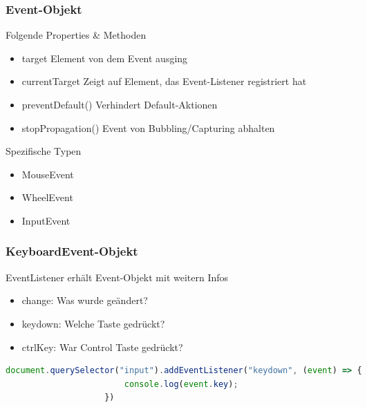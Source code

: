 \documentclass[a4paper, landscape, 8pt]{scrartcl}
\begin{document}
\begin{multicols*}{4}
        \subsubsection{Event-Objekt}
        Folgende Properties \& Methoden
        \begin{itemize}
            \item target
            \subitem Element von dem Event ausging
            \item currentTarget
            \subitem Zeigt auf Element, das Event-Listener registriert hat
            \item preventDefault()
            \subitem Verhindert Default-Aktionen
            \item stopPropagation()
            \subitem Event von Bubbling/Capturing abhalten
        \end{itemize}
        Spezifische Typen
        \begin{itemize}
            \item MouseEvent
            \item WheelEvent
            \item InputEvent
        \end{itemize}

        \subsubsection{KeyboardEvent-Objekt}
        EventListener erhält Event-Objekt mit weitern Infos
        \begin{itemize}
            \item change: Was wurde geändert?
            \item keydown: Welche Taste gedrückt?
            \item ctrlKey: War Control Taste gedrückt?
        \end{itemize}
        \begin{lstlisting}[language=JavaScript]
                    document.querySelector("input").addEventListener("keydown", (event) => {
                        console.log(event.key);
                    })
        \end{lstlisting}


\end{multicols*}
\end{document}
